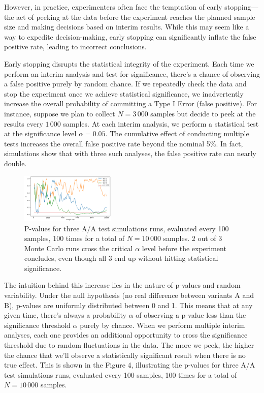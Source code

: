 \documentclass[final,5p,times,twocolumn,authoryear]{elsarticle}
\begin{document}
However, in practice, experimenters often face the temptation of early stopping—the act of peeking at the data before the experiment reaches the planned sample size and making decisions based on interim results. While this may seem like a way to expedite decision-making, early stopping can significantly inflate the false positive rate, leading to incorrect conclusions.

Early stopping disrupts the statistical integrity of the experiment. Each time we perform an interim analysis and test for significance, there's a chance of observing a false positive purely by random chance. If we repeatedly check the data and stop the experiment once we achieve statistical significance, we inadvertently increase the overall probability of committing a Type I Error (false positive). For instance, suppose we plan to collect $ N = 3\,000 $ samples but decide to peek at the results every $ 1\,000 $ samples. At each interim analysis, we perform a statistical test at the significance level $ \alpha = 0.05 $. The cumulative effect of conducting multiple tests increases the overall false positive rate beyond the nominal 5\%. In fact, simulations show that with three such analyses, the false positive rate can nearly double.

\begin{figure}[h]
  \centering 
  \includegraphics[width=0.4\textwidth]{fig-4.png}  
  \caption{P-values for three A/A test simulations runs, evaluated every 100 samples, 100 times for a total of $ N=10\,000$ samples. 2 out of 3 Monte Carlo runs cross the critical $\alpha$ level before the experiment concludes, even though all 3 end up without hitting statistical significance.} 
\end{figure}

The intuition behind this increase lies in the nature of p-values and random variability. Under the null hypothesis (no real difference between variants A and B), p-values are uniformly distributed between 0 and 1. This means that at any given time, there's always a probability $ \alpha $ of observing a p-value less than the significance threshold $ \alpha $ purely by chance. When we perform multiple interim analyses, each one provides an additional opportunity to cross the significance threshold due to random fluctuations in the data. The more we peek, the higher the chance that we'll observe a statistically significant result when there is no true effect. This is shown in the Figure 4, illustrating the p-values for three A/A test simulations runs, evaluated every 100 samples, 100 times for a total of $ N=10\,000$ samples.
\end{document}
